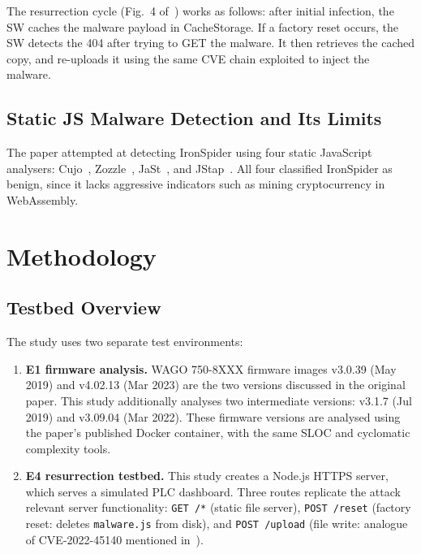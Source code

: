 \documentclass[conference]{IEEEtran}
\begin{document}
The resurrection cycle (Fig.~4 of~\cite{ironspider2024}) works as follows: after initial infection, the SW caches the malware payload in CacheStorage. If a factory reset occurs, the SW detects the 404 after trying to GET the malware. It then retrieves the cached copy, and re-uploads it using the same CVE chain exploited to inject the malware.

\subsection{Static JS Malware Detection and Its Limits}

The paper attempted at detecting IronSpider using four static JavaScript analysers: Cujo~\cite{cujo}, Zozzle~\cite{zozzle}, JaSt~\cite{jast}, and JStap~\cite{jstap}. All four classified IronSpider as benign, since it lacks aggressive indicators such as mining cryptocurrency in WebAssembly.

\section{Methodology}
\label{sec:methodology}

\subsection{Testbed Overview}

The study uses two separate test environments:

\begin{enumerate}
  \item \textbf{E1 firmware analysis.} WAGO 750-8XXX firmware images v3.0.39 (May 2019) and v4.02.13 (Mar 2023) are the two versions discussed in the original paper. This study additionally analyses two intermediate versions: v3.1.7 (Jul 2019) and v3.09.04 (Mar 2022). These firmware versions are analysed using the paper's published Docker container, with the same SLOC and cyclomatic complexity tools.

  \item \textbf{E4 resurrection testbed.} This study creates a Node.js HTTPS server, which serves a simulated PLC dashboard. Three routes replicate the attack relevant server functionality: \texttt{GET /*} (static file server), \texttt{POST /reset} (factory reset: deletes \texttt{malware.js} from disk), and \texttt{POST /upload} (file write: analogue of CVE-2022-45140 mentioned in~\cite{ironspider2024}).
\end{enumerate}
\end{document}
